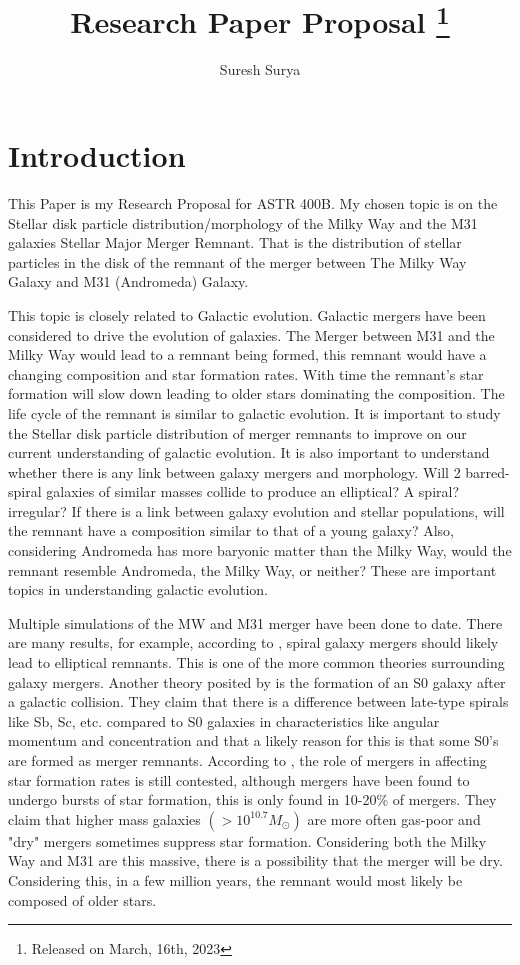 \documentclass[linenumbers, preprint, times]{aastex631}
\begin{document}
\title{Research Paper Proposal
\footnote{Released on March, 16th, 2023}}

\author{Suresh Surya}
\section{Introduction} \label{sec:style}
This Paper is my Research Proposal for ASTR 400B. My chosen topic is
on the Stellar disk particle distribution/morphology of the Milky Way and the M31 galaxies
Stellar Major Merger Remnant. That is the distribution of stellar particles in the disk of the
remnant of the merger between The Milky Way Galaxy and M31 (Andromeda) Galaxy.\par
This topic is closely related to Galactic evolution. Galactic mergers have been considered to drive the evolution of galaxies.  The Merger between M31 and the Milky Way would lead to a remnant being formed, this remnant would have a changing composition and star formation rates. 
With time the remnant's star formation will slow down leading to older stars dominating the composition. The life cycle of
the remnant is similar to galactic evolution. It is important to study the Stellar disk particle distribution of merger
remnants to improve on our current understanding of galactic evolution. It is also important to understand whether there is 
any link between galaxy mergers and morphology. Will 2 barred-spiral galaxies of similar masses collide to produce an elliptical? A spiral? irregular? If there is a link between galaxy evolution and stellar populations, will the
remnant have a composition similar to that of a young galaxy? Also, considering Andromeda has more baryonic matter than the Milky Way, would the remnant resemble Andromeda, the Milky Way, or neither? These are important topics in understanding
galactic evolution.\par
Multiple simulations of the MW and M31 merger have been done to date. There are many results, for example, according to \citet{Toomre_1972}, spiral galaxy mergers should likely lead to elliptical remnants. This is one of the more common theories surrounding galaxy mergers. Another theory posited by \citet{Querejeta_2015} is the formation of an S0 galaxy after a galactic collision. They claim that there is a difference between late-type spirals like Sb, Sc, etc. compared to S0 galaxies in characteristics like angular momentum and concentration and that a likely reason for this is that some S0's are formed as merger remnants. According to \citet{Pearson_2019}, the role of mergers in affecting star formation rates is still contested, although mergers have been found to undergo bursts of star formation, this is only found in 10-20\% of mergers. They claim that higher mass galaxies $(> 10^{10.7}M_\odot)$ are more often gas-poor and "dry" mergers sometimes suppress star formation. Considering both the Milky Way and M31 are this massive, there is a possibility that the merger will be dry. Considering this, in a few million years, the remnant would most likely be composed of older stars.\par
\end{document}
